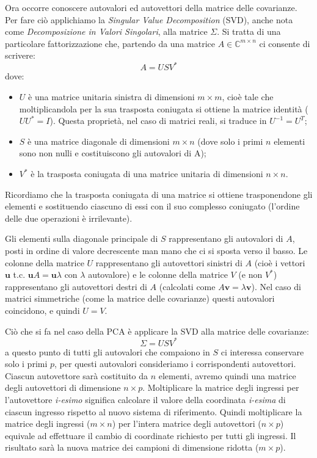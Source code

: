 Ora occorre conoscere autovalori ed autovettori della matrice delle covarianze. Per fare ciò applichiamo la \emph{Singular Value Decomposition} (SVD), anche nota come \emph{Decomposizione in Valori Singolari}, alla matrice $\Sigma$. Si tratta di una particolare fattorizzazione che, partendo da una matrice $A\in\mathbb{C}^{m\times n}$ ci consente di scrivere:
\begin{equation*}
A = U S V^*
\end{equation*}
dove:
\begin{itemize}
\item $U$ è una matrice unitaria sinistra di dimensioni $ m \times m$, cioè tale che moltiplicandola per la sua trasposta coniugata si ottiene la matrice identità ($U U^* = I$). Questa proprietà, nel caso di matrici reali, si traduce in $U^{-1} = U^T$;
\item $S$ è una matrice diagonale di dimensioni $m\times n$ (dove solo i primi $n$ elementi sono non nulli e costituiscono gli autovalori di A);
\item $V^*$ è la trasposta coniugata di una matrice unitaria di dimensioni $n\times n$.
\end{itemize}
Ricordiamo che la trasposta coniugata di una matrice si ottiene trasponendone gli elementi e sostituendo ciascuno di essi con il suo complesso coniugato (l'ordine delle due operazioni è irrilevante).

Gli elementi sulla diagonale principale di $S$ rappresentano gli autovalori di $A$, posti in ordine di valore decrescente man mano che ci si sposta verso il basso. Le colonne della matrice $U$  rappresentano gli autovettori sinistri di $A$ (cioè i vettori $\mathbf{u}$ t.c. $\mathbf{u}A=\mathbf{u}\lambda$ con $\lambda$ autovalore) e le colonne della matrice $V$ (e non $V^*$) rappresentano gli autovettori destri di $A$ (calcolati come $A\mathbf{v}=\lambda\mathbf{v} $). Nel caso di matrici simmetriche (come la matrice delle covarianze) questi autovalori coincidono, e quindi $U=V$. 

Ciò che si fa nel caso della PCA è applicare la SVD alla matrice delle covarianze:
\begin{equation*}
\Sigma = U S V^*
\end{equation*}
a questo punto di tutti gli autovalori che compaiono in $S$ ci interessa conservare solo i primi $p$, per questi autovalori consideriamo i corrispondenti autovettori. Ciascun autovettore sarà costituito da $n$ elementi, avremo quindi una matrice degli autovettori di dimensione $n \times p$.
Moltiplicare la matrice degli ingressi per l'autovettore \emph{i-esimo} significa calcolare il valore della coordinata \emph{i-esima} di ciascun ingresso rispetto al nuovo sistema di riferimento. Quindi moltiplicare la matrice degli ingressi ($m \times n$) per l'intera matrice degli autovettori ($n \times p$) equivale ad effettuare il cambio di coordinate richiesto per tutti gli ingressi. Il risultato sarà la nuova matrice dei campioni di dimensione ridotta ($m \times p$).

